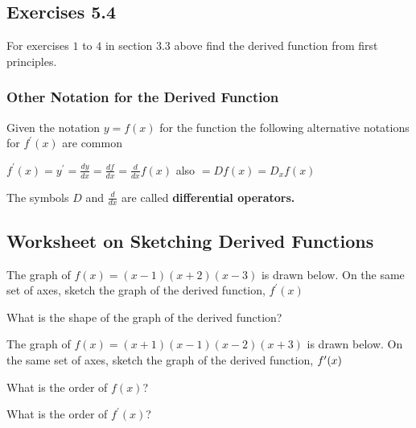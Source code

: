 \subsection{Exercises 5.4}
For exercises $1$ to $4$ in section 3.3 above find the derived function from first principles. 

\subsubsection{Other Notation for the Derived Function}
Given the notation $y =f (x)$ for the function the following alternative notations for $f^{ \prime } \left (x\right )$ are common 


\begin{center}
$f^{ \prime } (x) =y^{ \prime } =\frac{d y}{d x} =\frac{d f}{d x} =\frac{d}{d x} f (x)$ also $ =D f (x) =D_{x} f (x)$
\end{center}\par
The symbols $D$ and $\frac{d}{d x}$ are called \textbf{differential operators.} 

\subsection{Worksheet on Sketching Derived Functions}
The graph of $f (x) =(x -1) (x +2) (x -3)$ is drawn below. On the same set of axes, sketch the graph of the derived function, $f^{ \prime } (x)$\vspace{0.5cm} 

   
\setlength\fboxrule{0.01in}\setlength\fboxsep{0.2in}
\vspace{0.5cm} 

What is the shape of the graph of the derived function? 

The graph of $f (x) =(x +1) (x -1) (x -2) (x +3)$ is drawn below. On the same set of axes, sketch the graph of the derived function, $f^{ \prime } (x)\vspace{+0.500000cm}$ 

   
\setlength\fboxrule{0.01in}\setlength\fboxsep{0.2in}
\vspace{0.5cm}\vspace{0.5cm} 

What
is the order of $f (x)$? \vspace{0.5cm} 

What is the order of $f^{ \prime } (x)$?\vspace{0.5cm} 

